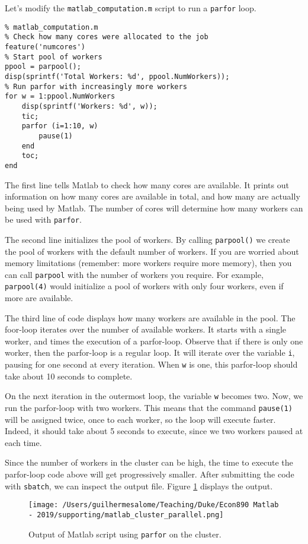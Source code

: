 \documentclass[12pt, a4paper]{article}
\begin{document}
Let's modify the \texttt{matlab\_computation.m} script to run a \texttt{parfor} loop.
\lstset{language=matlab,label= ,caption= ,captionpos=b,firstnumber=1,numbers=left,style=Matlab-editor}
\begin{lstlisting}
% matlab_computation.m
% Check how many cores were allocated to the job
feature('numcores')
% Start pool of workers
ppool = parpool();
disp(sprintf('Total Workers: %d', ppool.NumWorkers));
% Run parfor with increasingly more workers
for w = 1:ppool.NumWorkers
    disp(sprintf('Workers: %d', w));
    tic;
    parfor (i=1:10, w)
        pause(1)
    end
    toc;
end
\end{lstlisting}
The first line tells Matlab to check how many cores are available.
It prints out information on how many cores are available in total, and how many are actually being used by Matlab.
The number of cores will determine how many workers can be used with \texttt{parfor}.

The second line initializes the pool of workers.
By calling \texttt{parpool()} we create the pool of workers with the default number of workers.
If you are worried about memory limitations (remember: more workers require more memory), then you can call \texttt{parpool} with the number of workers you require.
For example, \texttt{parpool(4)} would initialize a pool of workers with only four workers, even if more are available.

The third line of code displays how many workers are available in the pool.
The foor-loop iterates over the number of available workers.
It starts with a single worker, and times the execution of a parfor-loop.
Observe that if there is only one worker, then the parfor-loop is a regular loop.
It will iterate over the variable \texttt{i}, pausing for one second at every iteration.
When \texttt{w} is one, this parfor-loop should take about 10 seconds to complete.

On the next iteration in the outermost loop, the variable \texttt{w} becomes two.
Now, we run the parfor-loop with two workers.
This means that the command \texttt{pause(1)} will be assigned twice, once to each worker, so the loop will execute faster.
Indeed, it should take about 5 seconds to execute, since we two workers paused at each time.

Since the number of workers in the cluster can be high, the time to execute the parfor-loop code above will get progressively smaller.
After submitting the code with \texttt{sbatch}, we can inspect the output file.
Figure \ref{fig:org4687b2a} displays the output.
\begin{figure}[H]
\centering
\texttt{[image: /Users/guilhermesalome/Teaching/Duke/Econ890 Matlab - 2019/supporting/matlab\_cluster\_parallel.png]}
\caption{\label{fig:org4687b2a}
Output of Matlab script using \texttt{parfor} on the cluster.}
\end{figure}
\end{document}
